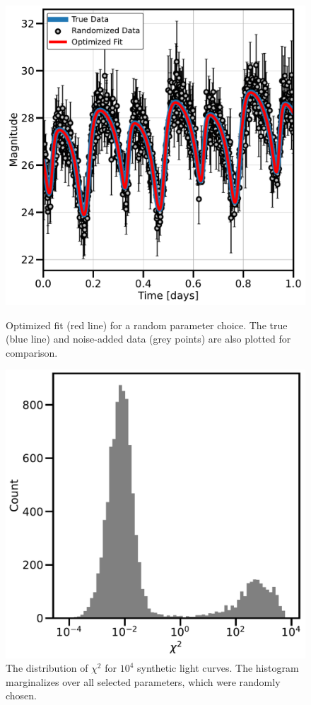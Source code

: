 \documentclass[twocolumn,doublespacing]{aastex631}
\begin{document}
\begin{figure}
  \centering
  \begin{minipage}[b]{0.45\textwidth}
    \includegraphics[width=\textwidth]{validation_lightcurve.pdf}
    \caption{Optimized fit (red line) for a random parameter choice. The true (blue line) and noise-added data (grey points) are also plotted for comparison. }
    \label{fig:light_valid}
  \end{minipage}
  \hfill
  \begin{minipage}[b]{0.45\textwidth}
    \includegraphics[width=\textwidth]{validation_chi2.pdf}
    \caption{The distribution of $\chi^2$ for $10^4$ synthetic light curves. The histogram marginalizes over all selected parameters, which were randomly chosen. }
    \label{fig:chi2_valid}
  \end{minipage}
\end{figure}
\end{document}
